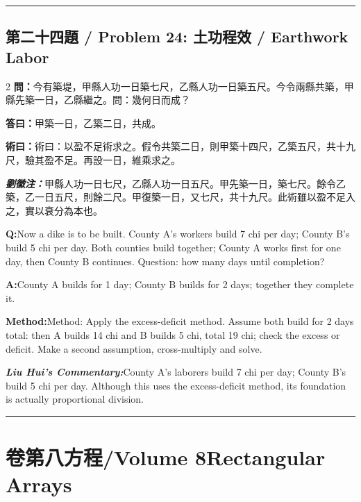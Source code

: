 \documentclass[11pt,a4paper]{article}
\newcommand{\cnwen}{\textcolor{cnlabelfg}{\textbf{問：}}}
\newcommand{\cnda}{\textbf{答曰：}}
\newcommand{\cnshu}{\textcolor{cnlabelfg}{\textbf{術曰：}}}
\newcommand{\cnzhu}{\textcolor{commentarycolor}{\textit{\textbf{劉徽注：}}}}
\newcommand{\enwen}{\textcolor{enlabelfg}{\textbf{Q:}}}
\newcommand{\enda}{\textcolor{enlabelfg}{\textbf{A:}}}
\newcommand{\enshu}{\textcolor{enlabelfg}{\textbf{Method:}}}
\newcommand{\enzhu}{\textcolor{enlabelfg}{\textit{\textbf{Liu Hui's Commentary:}}}}
\begin{document}
\bigskip\hrule\bigskip

\subsection{第二十四題 / Problem 24: 土功程效 / Earthwork Labor}

\begin{paracol}{2}
\switchcolumn[0]
\cnwen 今有築堤，甲縣人功一日築七尺，乙縣人功一日築五尺。今令兩縣共築，甲縣先築一日，乙縣繼之。問：幾何日而成？

\cnda 甲築一日，乙築二日，共成。

\cnshu 術曰：以盈不足術求之。假令共築二日，則甲築十四尺，乙築五尺，共十九尺，驗其盈不足。再設一日，維乘求之。

\cnzhu 甲縣人功一日七尺，乙縣人功一日五尺。甲先築一日，築七尺。餘令乙築，乙一日五尺，則餘二尺。甲復築一日，又七尺，共十九尺。此術雖以盈不足入之，實以衰分為本也。

\switchcolumn[1]
\enwen Now a dike is to be built. County A's workers build 7 chi per day; County B's build 5 chi per day. Both counties build together; County A works first for one day, then County B continues. Question: how many days until completion?

\enda County A builds for 1 day; County B builds for 2 days; together they complete it.

\enshu Method: Apply the excess-deficit method. Assume both build for 2 days total: then A builds 14 chi and B builds 5 chi, total 19 chi; check the excess or deficit. Make a second assumption, cross-multiply and solve.

\enzhu County A's laborers build 7 chi per day; County B's build 5 chi per day. Although this uses the excess-deficit method, its foundation is actually proportional division.
\end{paracol}

\bigskip\hrule\bigskip

\newpage
\section*{卷第八\quad 方程\quad /\quad Volume 8\quad Rectangular Arrays}
\end{document}
